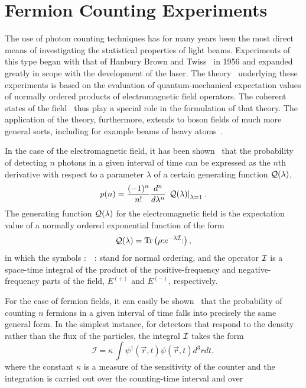 \documentclass[12pt]{article}
\def\beq{\begin{equation}}
\def\eeq{\end{equation}}
\def\dgr{\dagger}
\def\Tr{{\rm Tr}}
\def\costs{coherent states }
\def\opsp{operators}
\begin{document}
\section{Fermion Counting Experiments}
The use of photon counting techniques has for many years 
been the most direct means of
investigating the statistical properties of light beams. 
Experiments of this type began with that of Hanbury Brown
and Twiss~\cite{HBT} in 1956 and expanded greatly in scope         
with the development of the laser. 
The theory~\cite{GDW} underlying these experiments is based 
on the evaluation of quantum-mechanical expectation values of
normally ordered products of electromagnetic field \opsp.
The \costs of the field~\cite{rjg2} thus play a special role 
in the formulation of that theory. 
The application of the theory, furthermore, extends 
to boson fields of much more general sorts, 
including for example beams of heavy atoms~\cite{rjg3}.
\par
In the case of the electromagnetic field,
it has been shown~\cite{GDW} that the probability of detecting 
$ n $ photons in a given interval of time can be expressed 
as the $n$th derivative with respect to a parameter $ \lambda $
of a certain generating function $ \cal{Q} ( \lambda ) $,
\beq
p( n ) = \frac { (-1)^n }{ n! } \frac { d^n }{ d \lambda^n }
\, \left. \cal{Q} ( \lambda ) \right|_{ \lambda = 1 } .
\label {pQ}
\eeq
The generating function $ \cal{Q} ( \lambda ) $
for the electromagnetic field is the expectation value of a normally
ordered exponential function of the form
\beq
\mathcal{Q} ( \lambda ) = 
\Tr \left( \rho \mbox{:} e^ { - \lambda \mathcal{ I } } \mbox{:} 
\right) ,
\label {Q}
\eeq
in which the symbols $ \mbox{:} \quad \mbox{:} $ stand for normal ordering, 
and the operator $ \cal{ I } $ is a space-time integral of the
product of the positive-frequency and negative-frequency parts
of the field, $ E^{ (+) }$ and $ E^{ (-) }$, respectively.
\par
For the case of fermion fields, 
it can easily be shown~\cite{rjg3} that the probability of counting 
$ n $ fermions in a given interval of time falls into precisely 
the same general form. 
In the simplest instance,
for detectors that respond to the density rather than the flux
of the particles, the integral $ \cal{ I } $ 
takes the form 
\beq
\mathcal{ I } = \kappa \, 
\int \! \psi^\dgr ( \vec r , t ) \psi ( \vec r , t ) 
d^3r dt ,
\label {Ik}
\eeq
where the constant $ \kappa $ is a measure of the 
sensitivity of the counter and the integration is
carried out over the counting-time interval and over 
\end{document}
